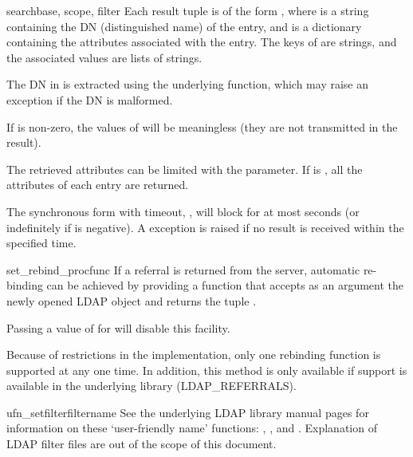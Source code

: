 \begin{methoddesc}[LDAP]{search}{base, scope, filter }
Each result tuple is of the form , 
where  is a string containing
the DN (distinguished name) of the entry, and 
 is a dictionary
containing the attributes associated with the entry. 
The keys of  are strings, 
and the associated values are lists of strings.

The DN in  is extracted using the underlying 
function,
which may raise an exception if the DN is malformed.

If  is non-zero, the values of  will be meaningless
(they are not transmitted in the result).

The retrieved attributes can be limited with the  parameter.
If  is , all the attributes of each entry are returned.

The synchronous form with timeout, , will block for at most
 seconds (or indefinitely if  is negative). A
 exception is raised if no result is received within the
specified time.
\end{methoddesc}


\begin{methoddesc}{set_rebind_proc}{func}
If a referral is returned from the server, automatic
re-binding can be achieved by providing a function that accepts as an argument
the newly opened LDAP object and returns the tuple .

Passing a value of  for  will disable
this facility. 

Because of restrictions in the implementation, only one
rebinding function is supported at any one time.
In addition, this method is only
available if support is available in the underlying library (LDAP_REFERRALS).
\end{methoddesc}


\begin{methoddesc}[LDAP]{ufn_setfilter}{filtername}	%
See the underlying LDAP library manual pages for information on these
`user-friendly name' functions:
	,
	, and
	.
Explanation of LDAP filter files are out 
of the scope of this document.  
\end{methoddesc}

